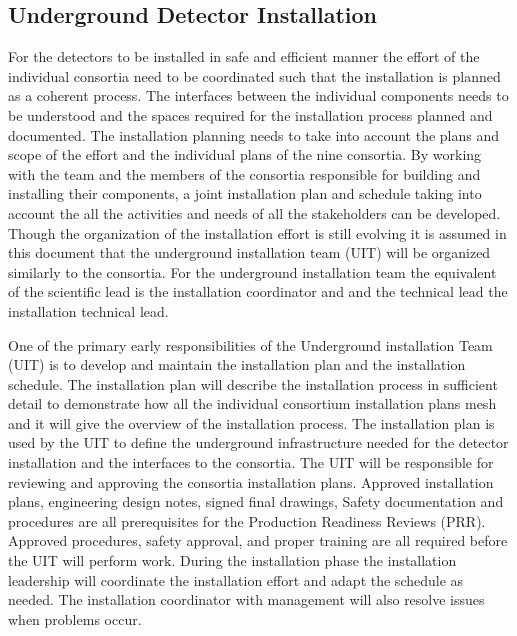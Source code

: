 

\subsection{Underground Detector Installation}
\label{sec:fdsp-coord-undergd}

For the  detectors to be installed in safe and efficient
manner the effort of the individual consortia need to be coordinated
such that the installation is planned as a coherent process. The
interfaces between the individual components needs to be understood
and the spaces required for the installation process planned and
documented. The installation planning needs to take into account the
plans and scope of the  effort and the individual plans of
the nine consortia. By working with the  team and the
members of the consortia responsible for building and installing their
components, a joint installation plan and schedule taking into account
the all the activities and needs of all the stakeholders can be
developed. Though the organization of the installation effort is still
evolving it is assumed in this document that the underground
installation team (UIT) will be organized similarly to the
consortia. For the underground installation team the equivalent of the
scientific lead is the installation coordinator and and the technical
lead the installation technical lead.

One of the primary early responsibilities of the Underground
installation Team (UIT) is to develop and maintain the 
installation plan and the installation schedule. The 
installation plan will describe the installation process in sufficient
detail to demonstrate how all the individual consortium installation
plans mesh and it will give the overview of the installation
process. The installation plan is used by the UIT to define the
underground infrastructure needed for the detector installation and
the interfaces to the consortia. The UIT will be responsible for
reviewing and approving the consortia installation plans. Approved
installation plans, engineering design notes, signed final drawings,
Safety documentation and procedures are all prerequisites for the
Production Readiness Reviews (PRR). Approved procedures, safety
approval, and proper training are all required before the UIT will
perform work. During the installation phase the installation
leadership will coordinate the  installation effort and
adapt the schedule as needed. The installation coordinator with
management will also resolve issues when problems occur.

